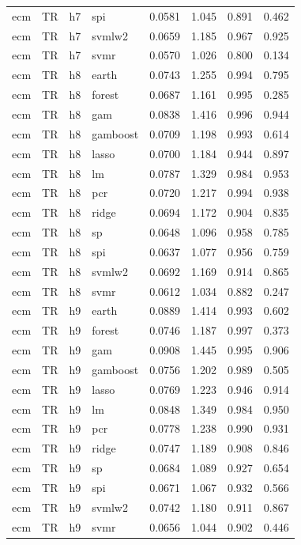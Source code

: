 \begin{ThreePartTable}
\begin{longtable}[t]{llclcccc}
ecm & TR & h7 & spi & 0.0581 & 1.045 & 0.891 & 0.462\\
ecm & TR & h7 & svmlw2 & 0.0659 & 1.185 & 0.967 & 0.925\\
ecm & TR & h7 & svmr & 0.0570 & 1.026 & 0.800 & 0.134\\
\addlinespace
ecm & TR & h8 & earth & 0.0743 & 1.255 & 0.994 & 0.795\\
ecm & TR & h8 & forest & 0.0687 & 1.161 & 0.995 & 0.285\\
ecm & TR & h8 & gam & 0.0838 & 1.416 & 0.996 & 0.944\\
ecm & TR & h8 & gamboost & 0.0709 & 1.198 & 0.993 & 0.614\\
ecm & TR & h8 & lasso & 0.0700 & 1.184 & 0.944 & 0.897\\
ecm & TR & h8 & lm & 0.0787 & 1.329 & 0.984 & 0.953\\
ecm & TR & h8 & pcr & 0.0720 & 1.217 & 0.994 & 0.938\\
ecm & TR & h8 & ridge & 0.0694 & 1.172 & 0.904 & 0.835\\
ecm & TR & h8 & sp & 0.0648 & 1.096 & 0.958 & 0.785\\
ecm & TR & h8 & spi & 0.0637 & 1.077 & 0.956 & 0.759\\
ecm & TR & h8 & svmlw2 & 0.0692 & 1.169 & 0.914 & 0.865\\
ecm & TR & h8 & svmr & 0.0612 & 1.034 & 0.882 & 0.247\\
\addlinespace
ecm & TR & h9 & earth & 0.0889 & 1.414 & 0.993 & 0.602\\
ecm & TR & h9 & forest & 0.0746 & 1.187 & 0.997 & 0.373\\
ecm & TR & h9 & gam & 0.0908 & 1.445 & 0.995 & 0.906\\
ecm & TR & h9 & gamboost & 0.0756 & 1.202 & 0.989 & 0.505\\
ecm & TR & h9 & lasso & 0.0769 & 1.223 & 0.946 & 0.914\\
ecm & TR & h9 & lm & 0.0848 & 1.349 & 0.984 & 0.950\\
ecm & TR & h9 & pcr & 0.0778 & 1.238 & 0.990 & 0.931\\
ecm & TR & h9 & ridge & 0.0747 & 1.189 & 0.908 & 0.846\\
ecm & TR & h9 & sp & 0.0684 & 1.089 & 0.927 & 0.654\\
ecm & TR & h9 & spi & 0.0671 & 1.067 & 0.932 & 0.566\\
ecm & TR & h9 & svmlw2 & 0.0742 & 1.180 & 0.911 & 0.867\\
ecm & TR & h9 & svmr & 0.0656 & 1.044 & 0.902 & 0.446\\

\end{longtable}
\end{ThreePartTable}
